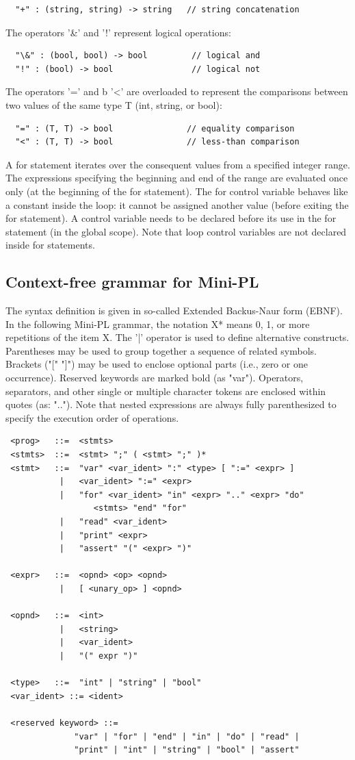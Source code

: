 \documentclass{article}
\begin{document}
\begin{verbatim}
  "+" : (string, string) -> string   // string concatenation
\end{verbatim}
The operators '\&' and '!' represent logical operations:

\begin{verbatim}
  "\&" : (bool, bool) -> bool         // logical and
  "!" : (bool) -> bool                // logical not
\end{verbatim}
The operators '=' and b '<' are overloaded to represent the comparisons between
two values of the same type T (int, string, or bool):

\begin{verbatim}
  "=" : (T, T) -> bool               // equality comparison
  "<" : (T, T) -> bool               // less-than comparison
\end{verbatim}
A for statement iterates over the consequent values from a specified integer
range. The expressions specifying the beginning and end of the range are
evaluated once only (at the beginning of the for statement). The for control
variable behaves like a constant inside the loop: it cannot be assigned another
value (before exiting the for statement). A control variable needs to be
declared before its use in the for statement (in the global scope). Note that
loop control variables are not declared inside for statements.

\subsection{Context-free grammar for Mini-PL}
The syntax definition is given in so-called Extended Backus-Naur form (EBNF).
In the following Mini-PL grammar, the notation X* means 0, 1, or more
repetitions of the item X. The '|' operator is used to define alternative
constructs. Parentheses may be used to group together a sequence of related
symbols. Brackets ("[" "]") may be used to enclose optional parts (i.e., zero
or one occurrence). Reserved keywords are marked bold (as "var"). Operators,
separators, and other single or multiple character tokens are enclosed within
quotes (as: ".."). Note that nested expressions are always fully parenthesized
to specify the execution order of operations.

\begin{verbatim}
 <prog>   ::=  <stmts>
 <stmts>  ::=  <stmt> ";" ( <stmt> ";" )*
 <stmt>   ::=  "var" <var_ident> ":" <type> [ ":=" <expr> ]
           |   <var_ident> ":=" <expr>
           |   "for" <var_ident> "in" <expr> ".." <expr> "do"
                  <stmts> "end" "for"
           |   "read" <var_ident>
           |   "print" <expr>
           |   "assert" "(" <expr> ")"

 <expr>   ::=  <opnd> <op> <opnd>
           |   [ <unary_op> ] <opnd>

 <opnd>   ::=  <int>
           |   <string>
           |   <var_ident>
           |   "(" expr ")"

 <type>   ::=  "int" | "string" | "bool"
 <var_ident> ::= <ident>

 <reserved keyword> ::=
              "var" | "for" | "end" | "in" | "do" | "read" |
              "print" | "int" | "string" | "bool" | "assert"
\end{verbatim}
\end{document}
